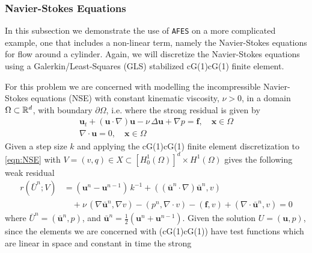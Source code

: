 \subsubsection{Navier-Stokes Equations} \label{sss:NSE}

    In this subsection we demonstrate the use of \texttt{AFES} on a more complicated
    example, one that includes a non-linear term, namely the Navier-Stokes
    equations for flow around a cylinder.  Again, we will discretize the
    Navier-Stokes equations using a Galerkin\slash Least-Squares (GLS)
    stabilized cG(1)cG(1) finite element.

    For this problem we are concerned with modelling the incompressible
    Navier-Stokes equations (NSE) with constant kinematic viscosity, $\nu>0$, in
    a domain $\Omega\subset \mathbb{R}^d$, with boundary $\partial \Omega$, i.e.  where
    the strong residual is given by
    \begin{equation}
        \begin{split}
            \mathbf{u}_t + \left( \mathbf{u} \cdot \nabla \right) \mathbf{u}
                - \nu\, \Delta \mathbf{u} + \nabla p = \mathbf{f},
                    \quad \mathbf{x} \in \Omega \\
            \nabla \cdot \mathbf{u} = 0, \quad \mathbf{x} \in \Omega
        \end{split}
    \label{eqn:NSE}
    \end{equation}
    Given a step size $k$ and applying the cG(1)cG(1) finite element discretization
    to \eqref{eqn:NSE} with $V = (v, q) \in X \subset [H^1_0(\Omega)]^d \times
    H^1(\Omega)$ gives the following weak residual
    \begin{equation}
    \begin{split}
        r(\bar{U}^n; V) &= \left(\mathbf{u}^n - \mathbf{u}^{n-1}\right)\,k^{-1}
            + (\left( \bar{\mathbf{u}}^n \cdot \nabla \right) \bar{\mathbf{u}}^n, v) \\
            &\quad+ \nu\, (\nabla \bar{\mathbf{u}}^n, \nabla v)
            - (p^n, \nabla \cdot v) - (\mathbf{f}, v)
            + (\nabla \cdot \bar{\mathbf{u}}^n, v) = 0
    \end{split}
    \label{eqn:WeakNSE}
    \end{equation}
    where $\bar{U}^n = (\bar{\mathbf{u}}^n,p)$, and $\bar{\mathbf{u}}^n =
    \frac{1}{2}\left(\mathbf{u}^n + \mathbf{u}^{n-1}\right)$. Given the solution
    $U=(\mathbf{u},p)$, since the elements we are concerned with (cG(1)cG(1)) have
    test functions which are linear in space and constant in time the strong
